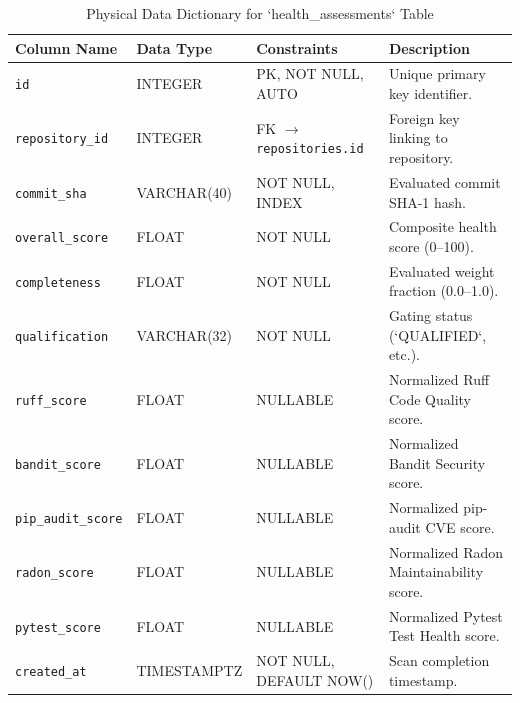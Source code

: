 \documentclass[12pt,a4paper,oneside]{report}
\begin{document}
\begin{table}[htbp]
    \centering
    \caption{Physical Data Dictionary for `health\_assessments` Table}
    \label{tab:app-dict-health}
    \small
    \begin{tabularx}{\textwidth}{p{} p{} p{} p{}}
        \toprule
        \textbf{Column Name} & \textbf{Data Type} & \textbf{Constraints} & \textbf{Description} \\
        \midrule
        \texttt{id} & INTEGER & PK, NOT NULL, AUTO & Unique primary key identifier. \\
        \texttt{repository\_id} & INTEGER & FK $\to$ \texttt{repositories.id} & Foreign key linking to repository. \\
        \texttt{commit\_sha} & VARCHAR(40) & NOT NULL, INDEX & Evaluated commit SHA-1 hash. \\
        \texttt{overall\_score} & FLOAT & NOT NULL & Composite health score (0--100). \\
        \texttt{completeness} & FLOAT & NOT NULL & Evaluated weight fraction (0.0--1.0). \\
        \texttt{qualification} & VARCHAR(32) & NOT NULL & Gating status (`QUALIFIED`, etc.). \\
        \texttt{ruff\_score} & FLOAT & NULLABLE & Normalized Ruff Code Quality score. \\
        \texttt{bandit\_score} & FLOAT & NULLABLE & Normalized Bandit Security score. \\
        \texttt{pip\_audit\_score} & FLOAT & NULLABLE & Normalized pip-audit CVE score. \\
        \texttt{radon\_score} & FLOAT & NULLABLE & Normalized Radon Maintainability score. \\
        \texttt{pytest\_score} & FLOAT & NULLABLE & Normalized Pytest Test Health score. \\
        \texttt{created\_at} & TIMESTAMPTZ & NOT NULL, DEFAULT NOW() & Scan completion timestamp. \\
        \bottomrule
    \end{tabularx}
\end{table}
\end{document}
